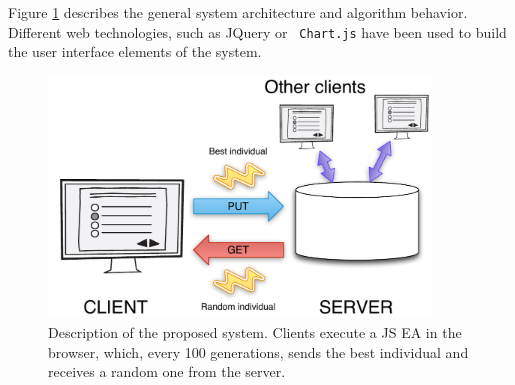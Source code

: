 \documentclass[journal,onecolumn]{IEEEtran}
\begin{document}
Figure \ref{fig:system} describes the general system architecture and
algorithm behavior. Different web technologies, such as JQuery or {\tt
  Chart.js} have
been used to build the user interface elements of the system.
\begin{figure}[!t]
\centering
\includegraphics[width=4in]{system.pdf}
\caption{Description of the proposed system. Clients execute a JS EA
  in the browser, which, every 100 generations, sends the best
  individual and receives a random one from the server.}
\label{fig:system}
\end{figure}
\end{document}
